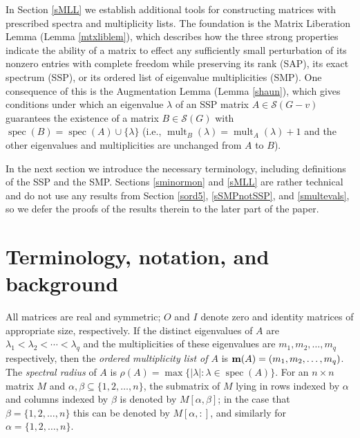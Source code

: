 \documentclass[11pt]{article}
\theoremstyle{definition}
\theoremstyle{definition}
\theoremstyle{definition}
\DeclareMathOperator{\mult}{mult}
\newcommand{\oml}{{\bf m}}
\newcommand{\x}{\times}
\newcommand{\lam}{\lambda}
\newcommand{\mptn}{\mathcal{S}} %
\def\spec{\operatorname{spec}}
\begin{document}
In Section \ref{sMLL} we establish additional tools for constructing matrices with prescribed spectra and multiplicity lists. The foundation  is the Matrix Liberation Lemma (Lemma \ref{mtxliblem}), which describes how the three strong properties indicate the ability of a matrix
to effect any sufficiently small perturbation of its nonzero entries with complete freedom
while preserving its rank (SAP), its exact spectrum (SSP), or its ordered list of eigenvalue multiplicities (SMP).
One consequence of this is the Augmentation Lemma (Lemma \ref{shaun}), which gives  conditions under which  an eigenvalue $\lambda$ of an SSP matrix $A\in \mptn(G-v)$ guarantees the existence of a matrix $B\in\mptn(G)$ with $\spec(B)=\spec(A)\cup\{\lambda\}$ (i.e., $\mult_B(\lambda)=\mult_A(\lambda)+1$ and the other eigenvalues and multiplicities are unchanged from $A$ to $B$).



 In the next section we introduce the necessary terminology, including definitions of the SSP and the SMP.  Sections \ref{sminormon} and \ref{sMLL} %
 are rather technical and do not use any results from Section \ref{sord5}, \ref{sSMPnotSSP}, and \ref{smultevals}, so we 
 defer the proofs of the results therein to the later part of the paper.





\section{Terminology, notation, and background}
\label{sterm}

 All matrices are real and symmetric; $O$ and $I$ denote  zero and identity matrices of appropriate size, respectively. If the distinct eigenvalues of $A$ are $\lambda_1< \lambda_2< \cdots< \lambda_q$ and the multiplicities 
of these eigenvalues are $m_1, m_2, \ldots, m_q$ respectively, then the {\it ordered multiplicity list of $A$} 
is $\oml(A)=(m_1, m_2, \ldots, m_q)$.  The {\em spectral radius} of $A$ is $\rho(A)=\max \{|\lam|: \lam\in\spec(A)\}$.  
For an $n\x n$ matrix $M$ and $\alpha,\beta \subseteq \{1,2,\ldots,n\}$,
the submatrix of $M$ lying in rows indexed by
$\alpha$ and columns indexed by $\beta$ is denoted
by $M[\alpha,\beta]$; in the case that $\beta=\{1,2,\ldots,n\}$ this can be denoted by $M[\alpha, :]$, and similarly for $\alpha=\{1,2,\ldots,n\}$.
\end{document}
